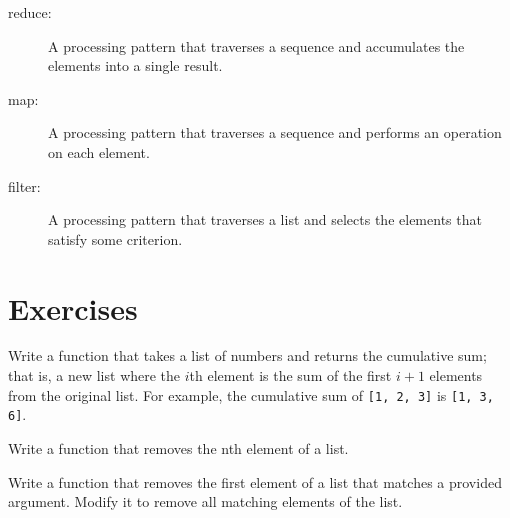 \documentclass[10pt]{book}
\begin{document}
{\begin{description}
\item[reduce:] A processing pattern that traverses a sequence 
and accumulates the elements into a single result.

\item[map:] A processing pattern that traverses a sequence and
performs an operation on each element.

\item[filter:] A processing pattern that traverses a list and
selects the elements that satisfy some criterion.

% 
% 
% 
% 
% 
% 
\end{description}


\section{Exercises}

\begin{ex}
Write a function that takes a list of numbers and returns the
cumulative sum; that is, a new list where the $i$th element
is the sum of the first $i+1$ elements from the original list.
For example, the cumulative sum of {\tt [1, 2, 3]} is
{\tt [1, 3, 6]}. 
\end{ex}

\begin{ex}
Write a function that removes the nth element of a list.
\end{ex}

\begin{ex}
Write a function that removes the first element of a list that
matches a provided argument. Modify it to remove all matching 
elements of the list.
\end{ex}


}
\end{document}
